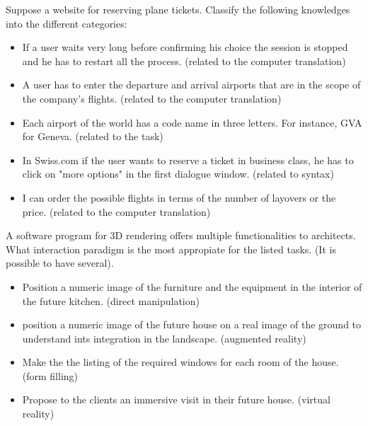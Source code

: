 \begin{exercise}
Suppose a website for reserving plane tickets. Classify the following knowledges into the different categories:
\end{exercise}
\begin{itemize}
\item If a user waits very long before confirming his choice the session is stopped and he has to restart all the process. (related to the computer translation)
\item A user has to enter the departure and arrival airports that are in the scope of the company's flights. (related to the computer translation)
\item Each airport of the world has a code name in three letters. For instance, GVA for Geneva. (related to the task)
\item In Swiss.com if the user wants to reserve a ticket in business class, he has to click on "more options" in the first dialogue window. (related to syntax)
\item I can order the possible flights in terms of the number of layovers or the price. (related to the computer translation)
\end{itemize}

\begin{exercise}
A software program for 3D rendering offers multiple functionalities to architects. What interaction paradigm is the most appropiate for the listed tasks. (It is possible to have several).
\end{exercise}
\begin{itemize}
\item Position a numeric image of the furniture and the equipment in the interior of the future kitchen. (direct manipulation)
\item position a numeric image of the future house on a real image of the ground to understand ints integration in the landscape. (augmented reality)
\item Make the the listing of the required windows for each room of the house. (form filling)
\item Propose to the clients an immersive visit in their future house. (virtual reality)
\end{itemize}

